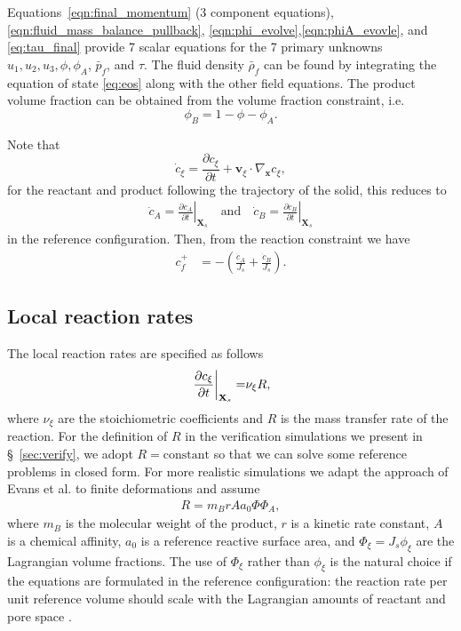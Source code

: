 \documentclass[11pt]{article}
\begin{document}
Equations~\eqref{eqn:final_momentum} (3 component equations), \eqref{eqn:fluid_mass_balance_pullback}, \eqref{eqn:phi_evolve},\eqref{eqn:phiA_evovle}, and \eqref{eq:tau_final} provide 7 scalar equations for the 7 primary unknowns $u_1, u_2, u_3, \phi, \phi_A$, $\bar{p}_f$, and $\tau$.
The fluid density $\bar\rho_f$ can be found by integrating the equation of state \eqref{eq:eos} along with the other field equations. The product volume fraction can be obtained from the volume fraction constraint, i.e.\
%
\begin{equation*}
  \phi_B = 1 - \phi - \phi_A.
\end{equation*}

Note that
%
\[
\dot{c}_\xi = \frac{\partial c_\xi}{\partial t} + \mathbf{v}_\xi \cdot \nabla_{\mathbf{x}} c_\xi,
\]
%
for the reactant and product following the trajectory of the solid, this reduces to
%
\begin{align*}
\dot{c}_A = \left.\frac{\partial c_A}{\partial t}\right\vert_{\mathbf{X}_s} \quad\mbox{and}\quad 
\dot{c}_B = \left.\frac{\partial c_B}{\partial t}\right\vert_{\mathbf{X}_s}
\end{align*}
%
in the reference configuration.  Then, from the reaction constraint we have
%
\begin{align*}
  c^{+}_f &= -\left(\frac{\dot{c}_A}{J_s} + \frac{\dot{c}_B}{J_s}\right).
\end{align*}
%
\subsection{Local reaction rates}
The local reaction rates are specified as follows
%
\begin{align*}
  \left.\frac{\partial c_\xi}{\partial t}\right\vert_{\mathbf{X}_s} =& \nu_\xi R, \\
\end{align*}
%
where $\nu_\xi$ are the stoichiometric coefficients and $R$ is the mass transfer rate of the reaction.  For the definition of $R$ in the verification simulations we present in \S~\ref{sec:verify}, we adopt $R = \text{constant}$ so that we can solve some reference problems in closed form.  For more realistic simulations we adapt the approach of Evans et al. \cite{evans2018} to finite deformations and assume
%
\begin{align*}
   R = m_B r A a_0 \Phi \Phi_A,
\end{align*}
%
where $m_B$ is the molecular weight of the product, $r$ is a kinetic rate constant, $A$ is a chemical affinity, $a_0$ is a reference reactive surface area, and $\Phi_\xi = J_s \phi_\xi$ are the Lagrangian volume fractions.  The use of $\Phi_\xi$ rather than $\phi_\xi$ is the natural choice if the equations are formulated in the reference configuration: the reaction rate per unit reference volume should scale with the Lagrangian amounts of reactant and pore space \cite{coussy2007revisiting}.
\end{document}

